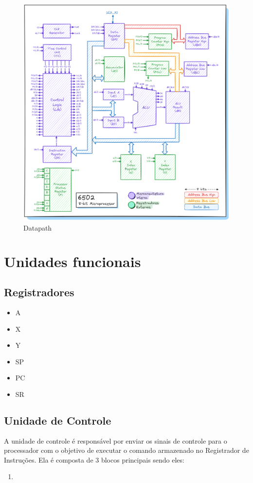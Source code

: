 \documentclass[
	12pt,				  %
	openright,		%
	a4paper,			%
	english,			%
	french,				%
	spanish,			%
	brazil,				%
]{abntex2}
\begin{document}
\begin{figure}[H]
	\centering
	\caption{Datapath} \label{fig:6502}
	\includegraphics[scale=0.25]{../assets/img/6502.png}
\end{figure}


\section{Unidades funcionais}

\subsection{Registradores}
\begin{itemize}
	\item A
	\item X
	\item Y
	\item SP
	\item PC
	\item SR
\end{itemize}
\subsection{Unidade de Controle}
A unidade de controle é responsável por enviar os sinais de controle para
o processador com o objetivo de executar o comando armazenado no Registrador
de Instruções. Ela é composta de 3 blocos principais sendo eles:
\begin{enumerate}
	\item
\end{enumerate}
\end{document}
